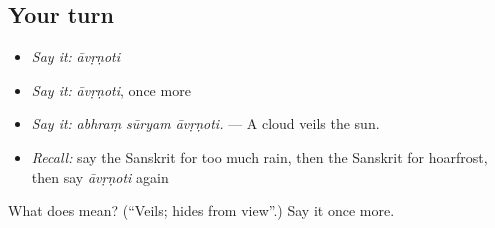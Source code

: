 \subsection*{Your turn}
\begin{itemize}
\raggedright
  \item \emph{Say it:} \emph{āvṛṇoti}
  \item \emph{Say it:} \emph{āvṛṇoti}, once more
  \item \emph{Say it:} \emph{abhraṃ sūryam āvṛṇoti.} — A cloud veils the sun.
  \item \emph{Recall:} say the Sanskrit for too much rain, then the Sanskrit for hoarfrost, then say \emph{āvṛṇoti} again
\end{itemize}

\begin{tcolorbox}[breakable,colback=teal!4,colframe=teal!35!black,title={Before you move on}]
What does  mean? (\textquotedblleft{}Veils; hides from view\textquotedblright{}.) Say it once more.
\end{tcolorbox}

